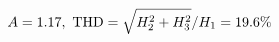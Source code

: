 \documentclass[preview]{standalone}
\begin{document}
\begin{align*}
\special{dvisvgm:raw <g id='unique000'>}A=1.17,\ \text{THD}=\sqrt{H_2^2+H_3^2}/H_1=19.6\%\special{dvisvgm:raw </g>}
\end{align*}
\end{document}
